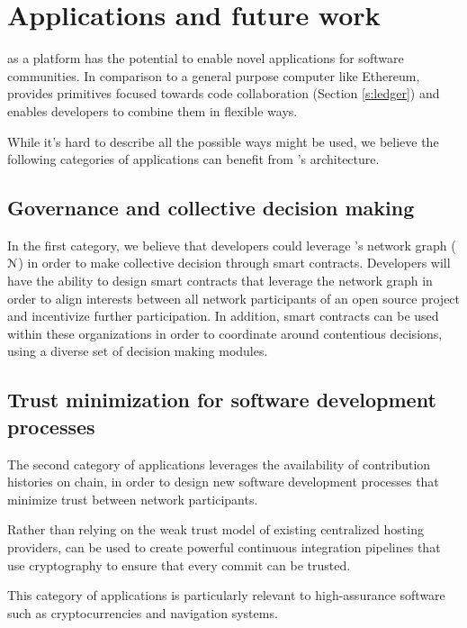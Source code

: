 
\section{Applications and future work}

\oscoin{} as a platform has the potential to enable novel applications for
software communities. In comparison to a general purpose computer like
Ethereum, \oscoin{} provides primitives focused towards code collaboration
(Section \ref{s:ledger}) and enables developers to combine them in flexible ways.

While it’s hard to describe all the possible ways \oscoin{} might be used, we
believe the following categories of applications can benefit from \oscoin{}’s
architecture.

\subsection{Governance and collective decision making}

In the first category, we believe that developers could leverage \oscoin{}’s
network graph ($\mathcal{N}$) in order to make collective decision through smart
contracts.  Developers will have the ability to design smart contracts that
leverage the network graph in order to align interests between all network
participants of an open source project and incentivize further participation.
In addition, smart contracts can be used within these organizations in order to
coordinate around contentious decisions, using a diverse set of decision making
modules.

\subsection{Trust minimization for software development processes}
The second category of applications leverages the availability of contribution
histories on chain, in order to design new software development processes that
minimize trust between network participants.

Rather than relying on the weak trust model of existing centralized hosting
providers, \oscoin{} can be used to create powerful continuous integration
pipelines that use cryptography to ensure that every commit can be trusted.

This category of applications is particularly relevant to high-assurance
software such as cryptocurrencies and navigation systems.

